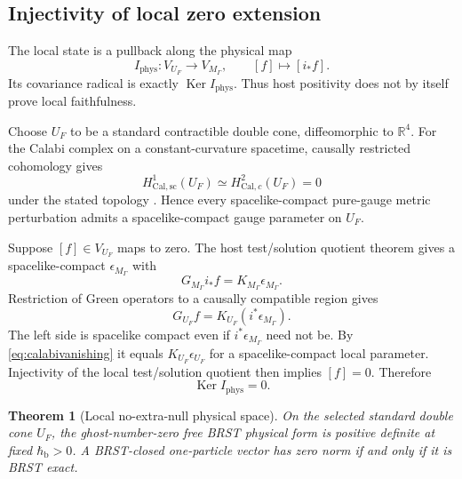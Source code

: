 \documentclass[11pt]{article}
\newtheorem{theorem}{Theorem}[section]
\theoremstyle{definition}
\theoremstyle{remark}
\newcommand{\U}{U_{F}}
\newcommand{\M}{M_{\Gamma}}
\newcommand{\Ker}{\operatorname{Ker}}
\newcommand{\hbarLB}{\hbar_{\mathrm{b}}}
\begin{document}
\subsection{Injectivity of local zero extension}

The local state is a pullback along the physical map
\begin{equation}
 I_{\mathrm{phys}}:V_{\U}\longrightarrow V_{\M},
 \qquad [f]\longmapsto[i_*f].
 \label{eq:Iphys}
\end{equation}
Its covariance radical is exactly $\Ker I_{\mathrm{phys}}$.  Thus host positivity does
not by itself prove local faithfulness.

Choose $\U$ to be a standard contractible double cone, diffeomorphic to $\mathbb R^4$.
For the Calabi complex on a constant-curvature spacetime, causally restricted
cohomology gives
\begin{equation}
 H^1_{\mathrm{Cal},\mathrm{sc}}(\U)
 \simeq H^2_{\mathrm{Cal},c}(\U)=0
 \label{eq:calabivanishing}
\end{equation}
under the stated topology \cite{Khavkine2014}.  Hence every spacelike-compact
pure-gauge metric perturbation admits a spacelike-compact gauge parameter on $\U$.

Suppose $[f]\in V_{\U}$ maps to zero.  The host test/solution quotient theorem
\cite{HackSchenkel2013} gives a spacelike-compact $\epsilon_{\M}$ with
\begin{equation}
 G_{\M} i_*f=K_{\M}\epsilon_{\M}.
\end{equation}
Restriction of Green operators to a causally compatible region
\cite{Baer2015} gives
\begin{equation}
 G_{\U} f=K_{\U}(i^*\epsilon_{\M}).
\end{equation}
The left side is spacelike compact even if $i^*\epsilon_{\M}$ need not be.  By
\cref{eq:calabivanishing} it equals $K_{\U}\epsilon_{\U}$ for a spacelike-compact local
parameter.  Injectivity of the local test/solution quotient then implies $[f]=0$.
Therefore
\begin{equation}
 \Ker I_{\mathrm{phys}}=0.
 \label{eq:Iinjective}
\end{equation}

\begin{theorem}[Local no-extra-null physical space]
On the selected standard double cone $\U$, the ghost-number-zero free BRST physical
form is positive definite at fixed $\hbarLB>0$.  A BRST-closed one-particle vector has
zero norm if and only if it is BRST exact.
\end{theorem}
\end{document}
